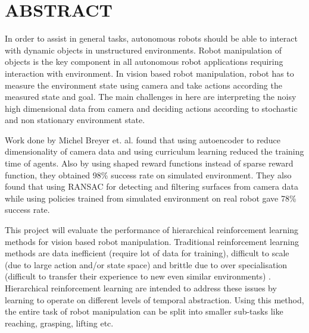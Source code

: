 \newpage
{}
\chapter*{\MakeUppercase{Abstract}}
In order to assist in general tasks, autonomous robots should be able to interact with dynamic objects in unstructured environments. Robot manipulation of objects is the key component in all autonomous robot applications requiring interaction with environment. In vision based robot manipulation, robot has to measure the environment state using camera and take actions according the measured state and goal. The main challenges in here are interpreting the noisy high dimensional data from camera and deciding actions according to stochastic and non stationary environment state.

Work done by Michel Breyer et. al. \cite{tasksimplification} found that using autoencoder to reduce dimensionality of camera data and using curriculum learning reduced the training time of agents. Also by using shaped reward functions instead of sparse reward function, they obtained 98\% success rate on simulated environment. They also found that using RANSAC for detecting and filtering surfaces from camera data while using policies trained from simulated environment on real robot gave 78\% success rate. 

This project will evaluate the performance of hierarchical reinforcement learning methods for vision based robot manipulation. Traditional reinforcement learning methods are data inefficient (require lot of data for training), difficult to scale (due to large action and/or state space) and brittle due to over specialisation (difficult to transfer their experience to new even similar environments) \cite{gradient}. Hierarchical reinforcement learning are intended to address these issues by learning to operate on different levels of temporal abstraction. Using this method, the entire task of robot manipulation can be split into smaller sub-tasks like reaching, grasping, lifting etc. 